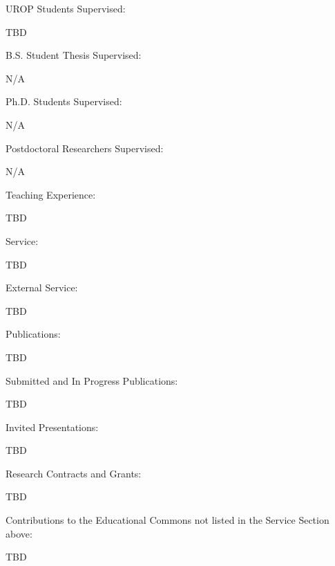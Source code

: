 \documentclass{article}
\begin{document}







\vspace{0.2in}
\noindent UROP Students Supervised:

TBD

\vspace{0.2in}
\noindent B.S. Student Thesis Supervised:

N/A

\vspace{0.2in}
\noindent Ph.D. Students Supervised:

N/A

\vspace{0.2in}
\noindent Postdoctoral Researchers Supervised:

N/A

\vspace{0.2in}
\noindent Teaching Experience:

TBD

\vspace{0.2in}
\noindent Service:

TBD

\vspace{0.2in}
\noindent External Service:

TBD

\vspace{0.2in}
\noindent Publications:

TBD

\vspace{0.2in}
\noindent Submitted and In Progress Publications:

TBD

\vspace{0.2in}
\noindent Invited Presentations:

TBD

\vspace{0.2in}
\noindent Research Contracts and Grants:

TBD

\vspace{0.2in}
\noindent Contributions to the Educational Commons not listed in the Service Section above:

TBD
\end{document}
